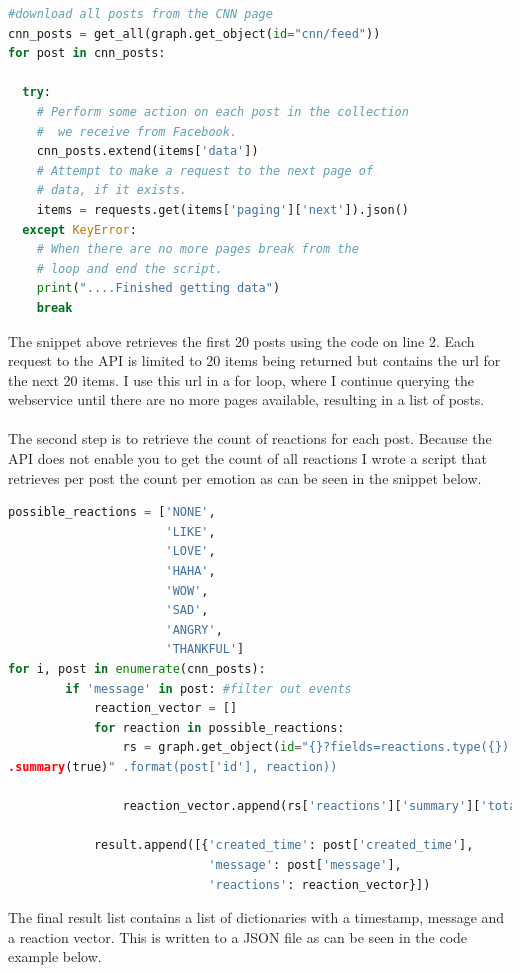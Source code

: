 \documentclass[
10pt, %
a4paper, %
oneside, %
headinclude,footinclude, %
BCOR5mm, %
]{scrartcl}
\begin{document}
\begin{lstlisting}[language=Python, caption=Script that retrieves the posts from a Facebook page]
#download all posts from the CNN page
cnn_posts = get_all(graph.get_object(id="cnn/feed"))
for post in cnn_posts:
        
  try:
    # Perform some action on each post in the collection
    #  we receive from Facebook.
    cnn_posts.extend(items['data'])
    # Attempt to make a request to the next page of 
    # data, if it exists.
    items = requests.get(items['paging']['next']).json()
  except KeyError:
    # When there are no more pages break from the
    # loop and end the script.
    print("....Finished getting data")
    break
\end{lstlisting}
The snippet above retrieves the first 20 posts using the code on line 2. Each request to the API is limited to 20 items being returned but contains the url for the next 20 items. I use this url in a for loop, where I continue querying the webservice until there are no more pages available, resulting in a list of posts. \\\\
The second step is to retrieve the count of reactions for each post. Because the API does not enable you to get the count of all reactions I wrote a script that retrieves per post the count per emotion as can be seen in the snippet below.

\begin{lstlisting}[language=Python, caption=Retrieving emotion vector using Facebook API]
possible_reactions = ['NONE', 
                      'LIKE', 
                      'LOVE', 
                      'HAHA', 
                      'WOW', 
                      'SAD', 
                      'ANGRY', 
                      'THANKFUL']
for i, post in enumerate(cnn_posts):      
        if 'message' in post: #filter out events
            reaction_vector = []
            for reaction in possible_reactions:
                rs = graph.get_object(id="{}?fields=reactions.type({})
.summary(true)" .format(post['id'], reaction))
                                     
                reaction_vector.append(rs['reactions']['summary']['total_count'])
  
            result.append([{'created_time': post['created_time'], 
                            'message': post['message'], 
                            'reactions': reaction_vector}])
\end{lstlisting}
The final result list contains a list of dictionaries with a timestamp, message and a reaction vector. This is written to a JSON file as can be seen in the code example below.
\end{document}

